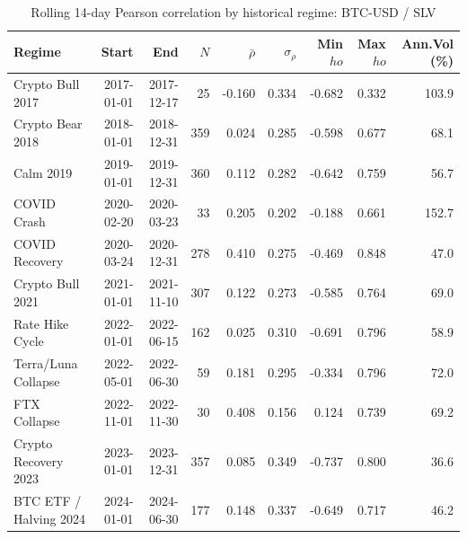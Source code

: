 \begin{table}[H]
\centering
\small
\caption{Rolling 14-day Pearson correlation by historical regime: BTC-USD / SLV}
\label{tab:regime_corr_BTCUSDSLV}
\begin{tabular}{lrrrrrrrr}
\toprule
Regime & Start & End & $N$ & $\bar{\rho}$ & $\sigma_\rho$ & Min $
ho$ & Max $
ho$ & Ann.Vol (\%) \\
\midrule
Crypto Bull 2017 & 2017-01-01 & 2017-12-17 & 25 & -0.160 & 0.334 & -0.682 & 0.332 & 103.9 \\
Crypto Bear 2018 & 2018-01-01 & 2018-12-31 & 359 & 0.024 & 0.285 & -0.598 & 0.677 & 68.1 \\
Calm 2019 & 2019-01-01 & 2019-12-31 & 360 & 0.112 & 0.282 & -0.642 & 0.759 & 56.7 \\
COVID Crash & 2020-02-20 & 2020-03-23 & 33 & 0.205 & 0.202 & -0.188 & 0.661 & 152.7 \\
COVID Recovery & 2020-03-24 & 2020-12-31 & 278 & 0.410 & 0.275 & -0.469 & 0.848 & 47.0 \\
Crypto Bull 2021 & 2021-01-01 & 2021-11-10 & 307 & 0.122 & 0.273 & -0.585 & 0.764 & 69.0 \\
Rate Hike Cycle & 2022-01-01 & 2022-06-15 & 162 & 0.025 & 0.310 & -0.691 & 0.796 & 58.9 \\
Terra/Luna Collapse & 2022-05-01 & 2022-06-30 & 59 & 0.181 & 0.295 & -0.334 & 0.796 & 72.0 \\
FTX Collapse & 2022-11-01 & 2022-11-30 & 30 & 0.408 & 0.156 & 0.124 & 0.739 & 69.2 \\
Crypto Recovery 2023 & 2023-01-01 & 2023-12-31 & 357 & 0.085 & 0.349 & -0.737 & 0.800 & 36.6 \\
BTC ETF / Halving 2024 & 2024-01-01 & 2024-06-30 & 177 & 0.148 & 0.337 & -0.649 & 0.717 & 46.2 \\
\bottomrule
\end{tabular}
\end{table}